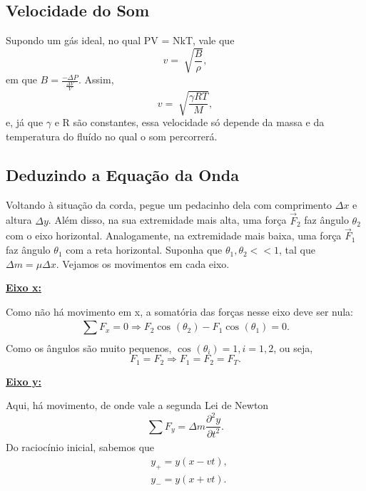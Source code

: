\documentclass[PhysicsII/physicsII_notes.tex]{subfiles}
\begin{document}
\subsection{Velocidade do Som}
Supondo um gás ideal, no qual PV = NkT, vale que
\[
	v = \sqrt[]{\frac{B}{\rho }},
\]
em que \(B = \frac{-\Delta P}{\frac{\Delta V}{V}}.\) Assim,
\[
	v = \sqrt[]{\frac{\gamma RT}{M}},
\]
e, já que \(\gamma \) e R são constantes, essa velocidade só depende da massa e da temperatura do fluído no qual
o som percorrerá.
\subsection{Deduzindo a Equação da Onda}
Voltando à situação da corda, pegue um pedacinho dela com comprimento \(\Delta x\) e altura \(\Delta y\). Além disso,
na sua extremidade mais alta, uma força \(\vec{F}_{2}\) faz ângulo \(\theta_{2}\) com o eixo horizontal. Analogamente,
na extremidade mais baixa, uma força \(\vec{F}_{1}\) faz ângulo \(\theta_{1}\) com a reta horizontal. Suponha que
\(\theta_{1}, \theta_{2} << 1\), tal que \(\Delta m = \mu\Delta x.\) Vejamos os movimentos em cada eixo.

\underline{\textbf{Eixo x:}}

Como não há movimento em x, a somatória das forças nesse eixo deve ser nula:
\[
	\sum\limits_{}^{}F_{x} = 0 \Rightarrow F_{2}\cos^{}{(\theta_{2})} - F_{1}\cos^{}{(\theta_{1})} = 0.
\]
Como os ângulos são muito pequenos, \(\cos^{}{(\theta_{i})} = 1,  i=1, 2\), ou seja,
\[
	F_{1} = F_{2} \Rightarrow F_{1} = F_{2} = F_{T}.
\]

\underline{\textbf{Eixo y:}}

Aqui, há movimento, de onde vale a segunda Lei de Newton
\[
	\sum\limits_{}^{}F_{y} = \Delta m \frac{\partial^{2}y}{\partial t^{2}}.
\]
Do raciocínio inicial, sabemos que
\begin{align*}
	 & y_{+} = y(x-vt), \\
	 & y_{-} = y(x+vt).
\end{align*}
\end{document}

